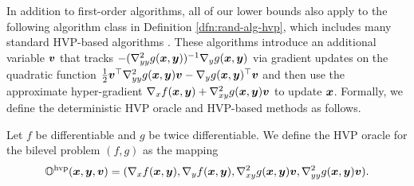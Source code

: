 \documentclass{article}
\begin{document}
In addition to first-order algorithms, all of our lower bounds also apply to the 
following algorithm class in Definition \ref{dfn:rand-alg-hvp}, which includes many standard HVP-based algorithms \citep{ghadimi2018approximation,ji2021bilevel,hong2023two}. 
These algorithms introduce an additional variable ${\bm{v}}$ that tracks $-(\nabla_{yy}^2 g({\bm{x}},{\bm{y}}))^{-1} \nabla_y g({\bm{x}},{\bm{y}})$ via gradient updates on the quadratic function $\frac{1}{2} {\bm{v}}^\top \nabla_{yy}^2 g({\bm{x}},{\bm{y}}) {\bm{v}} - \nabla_y g({\bm{x}},{\bm{y}})^\top {\bm{v}}$ and then use the approximate hyper-gradient $\nabla_x f({\bm{x}},{\bm{y}}) + \nabla_{xy}^2 g({\bm{x}},{\bm{y}}) {\bm{v}}$ to update ${\bm{x}}$. Formally, we define the deterministic HVP oracle and HVP-based methods as follows.





\begin{dfn}[HVP oracle] 
Let $f$ be differentiable and $g$ be twice differentiable. We define the HVP oracle for the bilevel problem $(f,g)$ as the mapping
\begin{align*}
 {\mathbb{O}}^{\rm hvp}({\bm{x}},{\bm{y}},{\bm{v}}) = (\nabla_x f({\bm{x}},{\bm{y}}), \nabla_y f({\bm{x}},{\bm{y}}), \nabla_{xy}^2 g({\bm{x}},{\bm{y}}) {\bm{v}}, \nabla_{yy}^2 g({\bm{x}},{\bm{y}}) {\bm{v}} ).
\end{align*}
\end{dfn}
\end{document}

